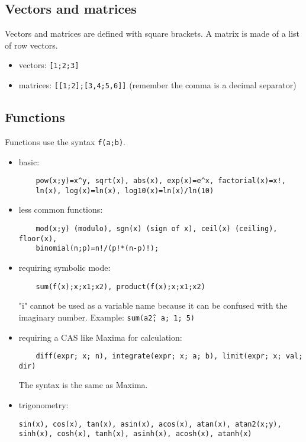 \subsection{Vectors and matrices}
Vectors and matrices are defined with square brackets. A matrix is made of a list of row vectors.
\begin{itemize}
\item vectors: \texttt{[1;2;3]}
\item matrices: \texttt{[[1;2];[3,4;5,6]]}
(remember the comma is a decimal separator)
\end{itemize}

\subsection{Functions}
Functions use the syntax \texttt{f(a;b)}.
\begin{itemize}
\item basic:
\begin{verbatim}
    pow(x;y)=x^y, sqrt(x), abs(x), exp(x)=e^x, factorial(x)=x!,
    ln(x), log(x)=ln(x), log10(x)=ln(x)/ln(10)
\end{verbatim}
\item less common functions:
\begin{verbatim}
    mod(x;y) (modulo), sgn(x) (sign of x), ceil(x) (ceiling), floor(x),
    binomial(n;p)=n!/(p!*(n-p)!);
\end{verbatim}
\item requiring symbolic mode:
\begin{verbatim}
    sum(f(x);x;x1;x2), product(f(x);x;x1;x2)
\end{verbatim}
"i" cannot be used as a variable name because it can be confused with the imaginary number.
Example: \texttt{sum(a\^2; a; 1; 5)}
\item requiring a CAS like Maxima for calculation:
\begin{verbatim}
    diff(expr; x; n), integrate(expr; x; a; b), limit(expr; x; val; dir)
\end{verbatim}
The syntax is the same as Maxima.
\item trigonometry:
\begin{verbatim}
sin(x), cos(x), tan(x), asin(x), acos(x), atan(x), atan2(x;y),
sinh(x), cosh(x), tanh(x), asinh(x), acosh(x), atanh(x)
\end{verbatim}
\end{itemize}
